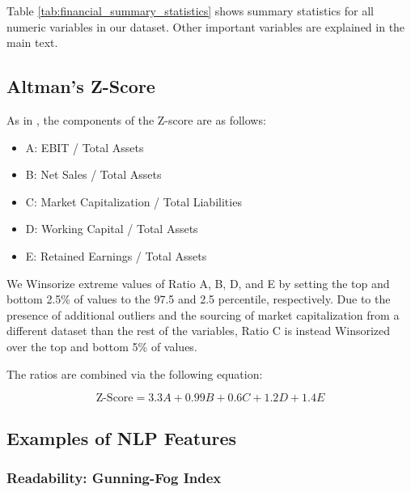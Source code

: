 \documentclass{article}[11pt]
\begin{document}
    Table \ref{tab:financial_summary_statistics} shows summary statistics for all numeric variables in our dataset. Other important variables are explained in the main text.

    

    \clearpage
    \newpage

    \subsection{Altman's Z-Score}

    \label{sec:altman-z-score}

    As in \cite{das_credit_2023}, the components of the Z-score are as follows:

    \begin{itemize}
        \item A: EBIT / Total Assets
        \item B: Net Sales / Total Assets
        \item C: Market Capitalization / Total Liabilities
        \item D: Working Capital / Total Assets
        \item E: Retained Earnings / Total Assets
    \end{itemize}

    We Winsorize extreme values of Ratio A, B, D, and E by setting the top and bottom 2.5\% of values to the 97.5 and 2.5 percentile, respectively. Due to the presence of additional outliers and the sourcing of market capitalization from a different dataset than the rest of the variables, Ratio C is instead Winsorized over the top and bottom 5\% of values. 

    The ratios are combined via the following equation:

    \begin{equation*}
        \text{Z-Score} = 3.3 A + 0.99 B + 0.6 C + 1.2 D + 1.4 E
    \end{equation*}

    \clearpage
    \newpage

    \subsection{Examples of NLP Features}

    \label{sec:nlp-examples}

    \subsubsection{Readability: Gunning-Fog Index}
\end{document}
